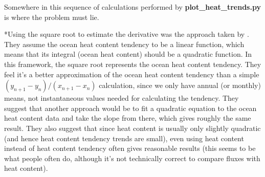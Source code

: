 Somewhere in this sequence of calculations performed by \textbf{plot_heat_trends.py} is where the problem must lie.

*Using the square root to estimate the derivative was the approach taken by \citet{Nummelin_2017}. They assume the ocean heat content tendency to be a linear function, which means that its integral (ocean heat content) should be a quadratic function. In this framework, the square root represents the ocean heat content tendency. They feel it's a better approximation of the ocean heat content tendency than a simple $(y_{n+1} - y_n) / (x_{n+1} - x_n)$ calculation, since we only have annual (or monthly) means, not instantaneous values needed for calculating the tendency. They suggest that another approach would be to fit a quadratic equation to the ocean heat content data and take the slope from there, which gives roughly the same result. They also suggest that since heat content is usually only slightly quadratic (and hence heat content tendency trends are small), even using heat content instead of heat content tendency often gives reasonable results (this seems to be what people often do, although it's not technically correct to compare fluxes with heat content).
